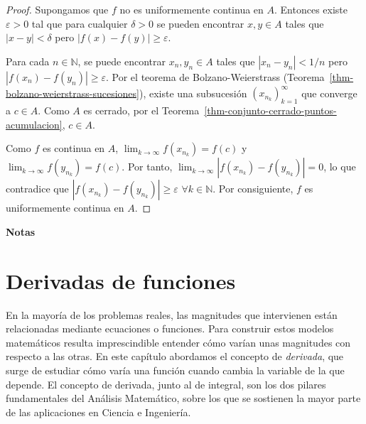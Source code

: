 \documentclass[
  a4paper,
]{scrreport}
\theoremstyle{definition}
\theoremstyle{definition}
\theoremstyle{definition}
\theoremstyle{plain}
\theoremstyle{plain}
\theoremstyle{plain}
\theoremstyle{remark}
\begin{document}
\begin{tcolorbox}[enhanced jigsaw, bottomtitle=1mm, title=\textcolor{quarto-callout-note-color}{\faInfo}\hspace{0.5em}{Demostración}, colbacktitle=quarto-callout-note-color!10!white, coltitle=black, leftrule=.75mm, colback=white, toptitle=1mm, toprule=.15mm, titlerule=0mm, opacitybacktitle=0.6, colframe=quarto-callout-note-color-frame, bottomrule=.15mm, arc=.35mm, rightrule=.15mm, breakable, left=2mm, opacityback=0]

\begin{proof}
Supongamos que \(f\) no es uniformemente continua en \(A\). Entonces
existe \(\varepsilon>0\) tal que para cualquier \(\delta>0\) se pueden
encontrar \(x,y\in A\) tales que \(|x-y|<\delta\) pero
\(|f(x)-f(y)|\geq \varepsilon\).

Para cada \(n\in\mathbb{N}\), se puede encontrar \(x_n,y_n\in A\) tales
que \(|x_n-y_n|<1/n\) pero \(|f(x_n)-f(y_n)|\geq \varepsilon\). Por el
teorema de Bolzano-Weierstrass
(Teorema~\ref{thm-bolzano-weierstrass-sucesiones}), existe una
subsucesión \((x_{n_k})_{k=1}^\infty\) que converge a \(c\in A\). Como
\(A\) es cerrado, por el
Teorema~\ref{thm-conjunto-cerrado-puntos-acumulacion}, \(c\in A\).

Como \(f\) es continua en \(A\), \(\lim_{k\to\infty}f(x_{n_k})=f(c)\) y
\(\lim_{k\to\infty}f(y_{n_k})=f(c)\). Por tanto,
\(\lim_{k\to\infty}|f(x_{n_k})-f(y_{n_k})|=0\), lo que contradice que
\(|f(x_{n_k})-f(y_{n_k})|\geq \varepsilon\) \(\forall k\in\mathbb{N}\).
Por consiguiente, \(f\) es uniformemente continua en \(A\).
\end{proof}

\end{tcolorbox}

\textbf{Notas}


\chapter{Derivadas de funciones}\label{derivadas-de-funciones}

En la mayoría de los problemas reales, las magnitudes que intervienen
están relacionadas mediante ecuaciones o funciones. Para construir estos
modelos matemáticos resulta imprescindible entender cómo varían unas
magnitudes con respecto a las otras. En este capítulo abordamos el
concepto de \emph{derivada}, que surge de estudiar cómo varía una
función cuando cambia la variable de la que depende. El concepto de
derivada, junto al de integral, son los dos pilares fundamentales del
Análisis Matemático, sobre los que se sostienen la mayor parte de las
aplicaciones en Ciencia e Ingeniería.
\end{document}
